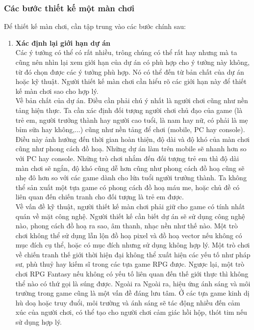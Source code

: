 \subsubsection{Các bước thiết kế một màn chơi}
\hspace*{0.5cm} Để thiết kế màn chơi, cần tập trung vào các bước chính sau:
\begin{enumerate}
	\item \textbf{Xác định lại giới hạn dự án}\\
	Các ý tưởng có thể có rất nhiều, trông chúng có thể rất hay nhưng mà ta cũng nên nhìn lại xem giới hạn của dự án có phù hợp cho ý tưởng này không, từ đó chọn được các ý tưởng phù hợp. Nó có thể đến từ bản chất của dự án hoặc kỹ thuật. Người thiết kế màn chơi cần hiểu rõ các giới hạn này để thiết kế màn chơi sao cho hợp lý.\\
	\hspace*{0.5cm} Về bản chất của dự án. Điều cần phải chú ý nhất là người chơi cũng như nền tảng hiện thực. Ta cần xác định đối tượng người chơi chủ đạo của game (là trẻ em, người trưởng thành hay người cao tuổi, là nam hay nữ, có phải là mẹ bỉm sữa hay không,...) cũng như nền tảng để chơi (mobile, PC hay console). Điều này ảnh hưởng đến thời gian hoàn thiện, độ dài và độ khó của màn chơi cũng như phong cách đồ hoạ. Những dự án làm trên mobile sẽ nhanh hơn so với PC hay console. Những trò chơi nhắm đến đối tượng trẻ em thì độ dài màn chơi sẽ ngắn, độ khó cũng dễ hơn cũng như phong cách đồ hoạ cũng sẽ nhẹ đô hơn so với các game dành cho lứa tuổi người trưởng thành. Ta không thể sản xuất một tựa game có phong cách đồ hoạ máu me, hoặc chủ đề có liên quan đến chiến tranh cho đối tượng là trẻ em được.\\
	\hspace*{0.5cm} Về vấn đề kỹ thuật, người thiết kế màn chơi phải giữ cho game có tính nhất quán về mặt công nghệ. Người thiết kế cần biết dự án sẽ sử dụng công nghệ nào, phong cách đồ hoạ ra sao, âm thanh, nhạc nền như thế nào. Một trò chơi không thể sử dụng lẫn lộn đồ hoạ pixel và đồ hoạ vector nếu không có mục đích cụ thể, hoặc có mục đích nhưng sử dụng không hợp lý. Một trò chơi về chiến tranh thế giới thời hiện đại không thể xuất hiện các yếu tố như pháp sư, phù thuỷ hay kiếm sĩ trong các tựa game RPG được. Ngược lại, một trò chơi RPG Fantasy nếu không có yếu tố liên quan đến thế giới thực thì không thể nào có thứ gọi là súng được. Ngoài ra  Ngoài ra, hiệu ứng ánh sáng và môi trường trong game cũng là một vấn đề đáng lưu tâm. Ở các tựa game kinh dị hù doạ hoặc truy đuổi, môi trường và ánh sáng sẽ tác động nhiều đến cảm xúc của người chơi, có thể tạo cho người chơi cảm giác hồi hộp, thót tim nếu sử dụng hợp lý.\\

\end{enumerate}

